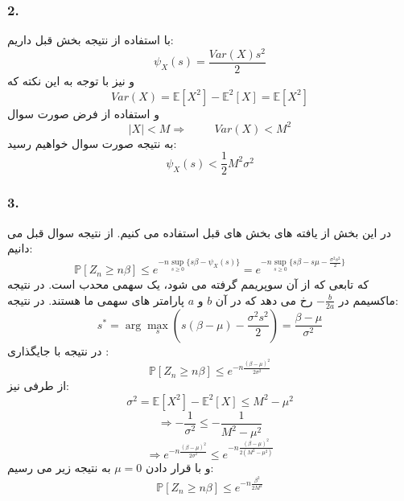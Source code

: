 \documentclass[]{article}
\begin{document}
	\subsubsection{2.}
	با استفاده از نتیجه بخش قبل داریم:
	\begin{equation}
		\nonumber
		\psi_X(s) = \frac{Var(X)s^2}{2}
	\end{equation}
	و نیز با توجه به این نکته که
	\begin{equation}
		\nonumber
		Var(X) = \mathbb{E}[X^2] - \mathbb{E}^2[X] = \mathbb{E}[X^2]
	\end{equation}
	و استفاده از فرض صورت سوال 
	\begin{equation}
		\nonumber
		|X| < M \Rightarrow \hspace{1cm} Var(X) < M^2
	\end{equation}
	به نتیجه صورت سوال خواهیم رسید:
	\begin{equation}
		\nonumber
		\psi_X(s) < \frac{1}{2} M^2 \sigma^2
	\end{equation}
	\subsubsection{3.}
	در این بخش از یافته های بخش های قبل استفاده می کنیم. از نتیجه سوال قبل می دانیم:
	\begin{equation}
		\nonumber
		\mathbb{P}[Z_n \geqslant n\beta] \leqslant e^{-n\sup_{s \geqslant 0}\{s\beta - \psi_X(s)\}} =
		e^{-n\sup_{s \geqslant 0}\{s\beta - s\mu - \frac{\sigma^2 s^2}{2}\}}
	\end{equation}
	که تابعی که از آن سوپریمم گرفته می شود، یک سهمی محدب است. در نتیجه ماکسیمم در 
	$-\frac{b}{2a}$
	رخ می دهد که در آن 
	$b$
	 و 
	 $a$
	 پارامتر های سهمی ما هستند.
	 در نتیجه:
	 \begin{equation}
	 	\nonumber
	 	s^* = \arg\max_s (s(\beta - \mu) - \frac{\sigma^2 s^2}{2}) = \frac{\beta - \mu}{\sigma^2}
	 \end{equation}
	 در نتیجه با جایگذاری :
	 \begin{equation}
	 	\nonumber
	 	\mathbb{P}[Z_n \geqslant n\beta] \leqslant e^{-n\frac{(\beta - \mu)^2}{2\sigma^2}}
	 \end{equation}
	 از طرفی نیز:
	 \begin{equation}
	 	\nonumber
	 	\sigma^2 = \mathbb{E}[X^2] - \mathbb{E}^2[X] \leqslant M^2 - \mu^2
	 \end{equation}
	 \begin{equation}
	 	\nonumber
	 	\Rightarrow -\frac{1}{\sigma^2} \leqslant -\frac{1}{M^2 - \mu^2}
	 \end{equation}
	 \begin{equation}
	 	\nonumber
	 	\Rightarrow e^{-n\frac{(\beta - \mu)^2}{2\sigma^2}} \leqslant e^{-n\frac{(\beta - \mu)^2}{2(M^2 - \mu^2)}}
	 \end{equation}
	 و با قرار دادن 
	 $\mu = 0$
	 به نتیجه زیر می رسیم:
	 \begin{equation}
	 	\nonumber
	 	\mathbb{P}[Z_n \geqslant n\beta] \leqslant e^{-n \frac{\beta^2}{2M^2}}
	 \end{equation}
	\newpage
\end{document}
